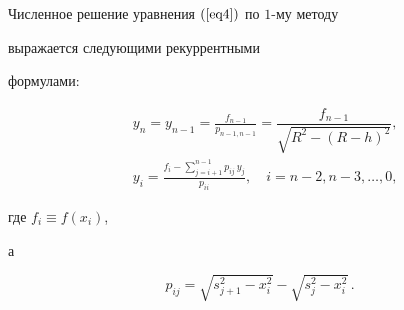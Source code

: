 \begin{thm}


Численное решение уравнения $(\ref{eq4})$ по $1$-му методу


выражается следующими рекуррентными


формулами\/${:}$


\begin{equation}


\label{eq11}


\begin{split}


&y_n=y_{n-1}=\frac{f_{n-1}}{p_{n-1,n-1}}=


\dfrac{f_{n-1}}{\sqrt{R^2-(R-h)^2}},\\


&y_i=\frac{f_i-\sum\limits_{j=i+1}^{n-1}p_{ij}\,y_j}{p_{ii}},


\quad i=n-2,n-3,\dotsc,0,


\end{split}


\end{equation}


где $f_i\equiv f(x_i)$,


а


\begin{equation}


\label{eq12}


p_{ij}=\sqrt{s_{j+1}^2-x_i^2}-\sqrt{s_j^2-x_i^2}\,.


\end{equation}


\end{thm}





